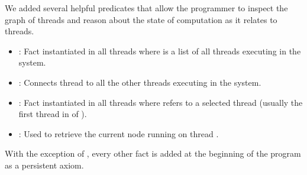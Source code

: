We added several helpful predicates that allow the programmer to inspect the
graph of threads and reason about the state of computation as it relates to
threads.

\begin{itemize}
   \item {}: Fact instantiated in all threads where
       is a list of all threads executing in the system.

   \item {}: Connects thread  to all the
      other threads  executing in the system.

   \item {}: Fact instantiated in all
      threads where  refers to a selected thread (usually the
      first thread in  of ).

   \item {}: Used to retrieve the current node 
      running on thread .
\end{itemize}

With the exception of , every other fact is added at the beginning
of the program as a persistent axiom.
